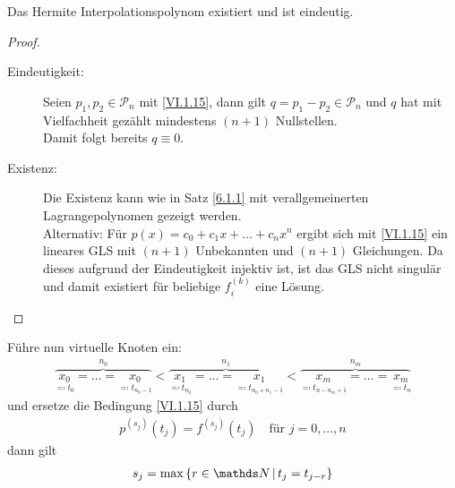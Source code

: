 \begin{Satze}\label{6.1.12}
  Das Hermite Interpolationspolynom existiert und ist eindeutig.

  \begin{proof}~
    \begin{description}
    \item[Eindeutigkeit:] Seien $p_1,p_2\in\mathcal{P}_n$ mit
      \eqref{VI.1.15}, dann gilt $q=p_1-p_2\in\mathcal{P}_n$
      und $q$ hat mit Vielfachheit gezählt mindestens
      $(n+1)$ Nullstellen.\\
      Damit folgt bereits $q\equiv 0$.
    \item[Existenz:] Die Existenz kann wie in Satz \ref{6.1.1}
      mit verallgemeinerten Lagrangepolynomen gezeigt werden.\\
      Alternativ: Für $p(x) = c_0+c_1x+ \dots +c_nx^n$ ergibt sich
      mit \eqref{VI.1.15} ein lineares GLS mit $(n+1)$ Unbekannten
      und $(n+1)$ Gleichungen.
      Da dieses aufgrund der Eindeutigkeit injektiv ist, ist das GLS
      nicht singulär und damit existiert für beliebige $f_i^{(k)}$ eine Lösung.
    \end{description}
  \end{proof}
\end{Satze}


Führe nun virtuelle Knoten ein:
\begin{gather*}
  \overbrace{\underset{\eqqcolon t_0}{x_0}
    =\dots
    = \underset{\eqqcolon t_{n_0-1}}{x_0}
  }^{n_0}
  <   \overbrace{\underset{\eqqcolon t_{n_0}}{x_1}=\dots
    = \underset{\eqqcolon t_{n_0+n_1-1}}{x_1}}^{n_1}
  <  \overbrace{\underset{\eqqcolon t_{n-n_m+1}}{x_m}=\dots
    = \underset{\eqqcolon t_{n}}{x_m}}^{n_m}
\end{gather*}
und ersetze die Bedingung \eqref{VI.1.15} durch
\begin{gather}
  p^{(s_j)}(t_j) = f^{(s_j)}(t_j) \quad \text{für } j=0,\dots,n
  \label{VI.1.17}
\end{gather}
dann gilt
\begin{gather}
  s_j= \max\left\{ r\in\N\, \middle\vert\, t_j=t_{j-r}\right\}
  \label{VI.1.18}
\end{gather}

